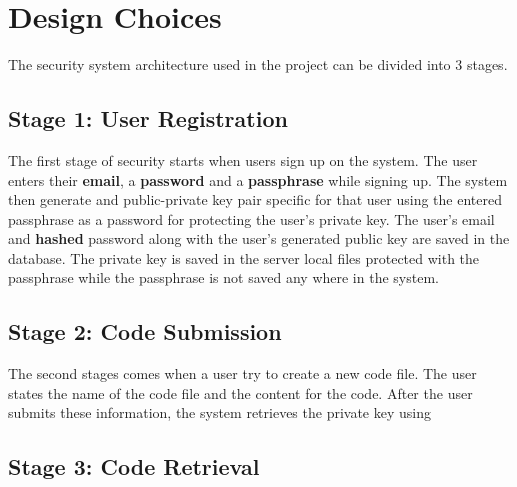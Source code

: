 \chapter{Design Choices}

The security system architecture used in the project can be divided into 3 stages.

\section{Stage 1: User Registration}

The first stage of security starts when users sign up on the system. The user enters their \textbf{email}, a \textbf{password} and a \textbf{passphrase} while signing up. The system then generate and public-private key pair specific for that user using the entered passphrase as a password for protecting the user's private key. The user's email and \textbf{hashed} password along with the user's generated public key are saved in the database. The private key is saved in the server local files protected with the passphrase while the passphrase is not saved any where in the system.

\section{Stage 2: Code Submission}

The second stages comes when a user try to create a new code file. The user states the name of the code file and the content for the code. After the user submits these information, the system retrieves the private key using 

\section{Stage 3: Code Retrieval}